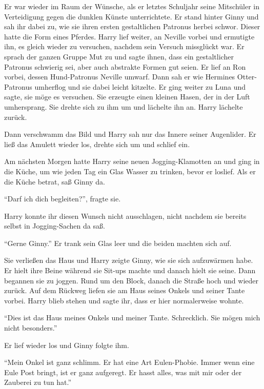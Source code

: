 \begin{traum}
Er war wieder im Raum der Wünsche, als er letztes Schuljahr seine Mitschüler in Verteidigung gegen die dunklen Künste unterrichtete. Er stand hinter Ginny und sah ihr dabei zu, wie sie ihren ersten gestaltlichen Patronus herbei schwor. Dieser hatte die Form eines Pferdes. Harry lief weiter, an Neville vorbei und ermutigte ihn, es gleich wieder zu versuchen, nachdem sein Versuch missglückt war. Er sprach der ganzen Gruppe Mut zu und sagte ihnen, dass ein gestaltlicher Patronus schwierig sei, aber auch abstrakte Formen gut seien. Er lief an Ron vorbei, dessen Hund-Patronus Neville umwarf. Dann sah er wie Hermines Otter-Patronus umherflog und sie dabei leicht kitzelte. Er ging weiter zu Luna und sagte, sie möge es versuchen. Sie erzeugte einen kleinen Hasen, der in der Luft umhersprang. Sie drehte sich zu ihm um und lächelte ihn an. Harry lächelte zurück.
\end{traum}

Dann verschwamm das Bild und Harry sah nur das Innere seiner Augenlider. Er ließ das Amulett wieder los, drehte sich um und schlief ein.

Am nächsten Morgen hatte Harry seine neuen Jogging-Klamotten an und ging in die Küche, um wie jeden Tag ein Glas Wasser zu trinken, bevor er loslief. Als er die Küche betrat, saß Ginny da.

\enquote{Darf ich dich begleiten?}, fragte sie.

Harry konnte ihr diesen Wunsch nicht ausschlagen, nicht nachdem sie bereits selbst in Jogging-Sachen da saß.

\enquote{Gerne Ginny.} Er trank sein Glas leer und die beiden machten sich auf.

Sie verließen das Haus und Harry zeigte Ginny, wie sie sich aufzuwärmen habe. Er hielt ihre Beine während sie Sit-ups machte und danach hielt sie seine. Dann begannen sie zu joggen. Rund um den Block, danach die Straße hoch und wieder zurück. Auf dem Rückweg liefen sie am Haus seines Onkels und seiner Tante vorbei. Harry blieb stehen und sagte ihr, dass er hier normalerweise wohnte.

\enquote{Dies ist das Haus meines Onkels und meiner Tante. Schrecklich. Sie mögen mich nicht besonders.}

Er lief wieder los und Ginny folgte ihm.

\enquote{Mein Onkel ist ganz schlimm. Er hat eine Art Eulen-Phobie. Immer wenn eine Eule Post bringt, ist er ganz aufgeregt. Er hasst alles, was mit mir oder der Zauberei zu tun hat.}


